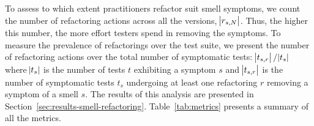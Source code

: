 
To assess to which extent practitioners refactor \gls{suit} smell symptoms, we count the number of refactoring actions across all the versions, $\abs{r_{s,N}}$. Thus, the higher this number, the more effort testers spend in removing the symptoms. To measure the prevalence of refactorings over the test suite, we present the number of refactoring actions over the total number of symptomatic tests: $\abs{t_{s,r}} / \abs{t_{s}}$ where $\abs{t_{s}}$ is the number of tests $t$ exhibiting a symptom $s$ and $\abs{t_{s,r}}$ is the number of symptomatic tests $t_s$ undergoing at least one refactoring $r$ removing a symptom of a smell $s$. The results of this analysis are presented in Section~\ref{sec:results-smell-refactoring}. Table~\ref{tab:metrics} presents a summary of all the metrics.